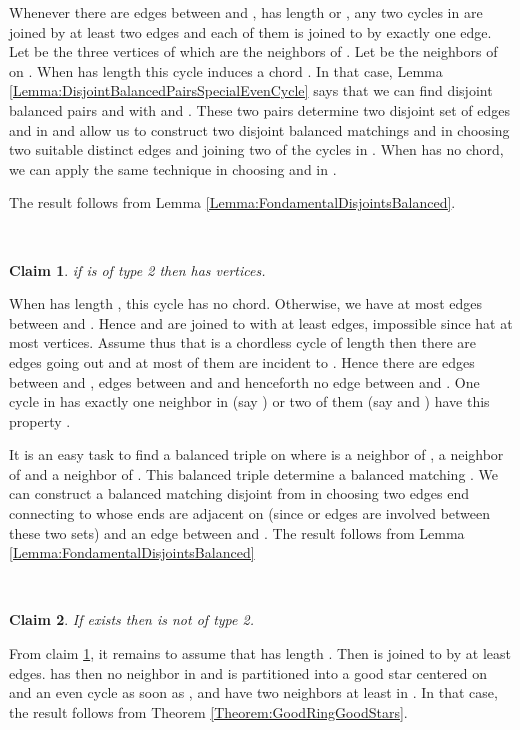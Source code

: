 \documentclass{elsart}
\theoremstyle{plain} \theoremheaderfont{\scshape}
\newtheorem{Clm}{Claim}[Thm]
\newenvironment{Prf}{{\bf \noindent Proof } }{\hfill\\}
\newenvironment{PrfClaim}{{\bf Proof }}{{\hfill\tiny{\\}}}
\begin{document}
\begin{Prf}
\begin{PrfClaim}
Whenever there are  edges between  and ,  has length
 or , any two cycles in  are joined by at
least two edges and  each of them is joined to  by exactly one
edge. Let  be the three vertices of  which are the neighbors
of . Let  be the neighbors of  on
. When  has length  this cycle induces a  chord .
In that case, Lemma
\ref{Lemma:DisjointBalancedPairsSpecialEvenCycle} says that we can
find  disjoint balanced pairs  and  with
  and  . These two pairs determine two
disjoint set of edges  and  in  and allow
us to construct two disjoint balanced matchings 
and  in choosing two suitable distinct edges  and
 joining two of the cycles in . When  has
no chord, we can apply the same technique in choosing  and  in
.

The result follows from Lemma
\ref{Lemma:FondamentalDisjointsBalanced}.

\end{PrfClaim}

\begin{Clm} \label{Claim:Claim4_1_MinimumCounterExample32}
if   is  of type 2 then  has  vertices.
\end{Clm}
\begin{PrfClaim} When  has length , this cycle has no chord. Otherwise, we
have at most  edges between  and . Hence  and
 are joined to  with at least  edges, impossible since
 hat at most  vertices. Assume thus that  is a chordless
cycle of length  then there are  edges going out  and at most  of them are incident to . Hence
there are  edges between  and , 
edges between  and  and henceforth no
edge between  and . One cycle in  has
exactly one neighbor in  (say ) or two of them (say 
and ) have this property .


It is an easy task to find a balanced triple  on  where
 is a neighbor of ,  a neighbor of  and  a
neighbor of . This balanced triple determine a balanced
matching . We can construct a balanced matching 
disjoint from  in choosing two edges  end  connecting  to  whose ends are adjacent on  (since  or
 edges are involved between these two sets) and an edge  between  and . The result follows from Lemma
\ref{Lemma:FondamentalDisjointsBalanced}

\end{PrfClaim}

\begin{Clm} \label{Claim:Claim4_2_MinimumCounterExample32}
If  exists then  is  not of type 2.
\end{Clm}
\begin{PrfClaim} From claim \ref{Claim:Claim4_1_MinimumCounterExample32}, it remains to assume that
  has length . Then  is joined to
 by at least  edges.  has then no neighbor in  and
 is partitioned into a good star centered on  and an even
cycle as soon as ,  and  have two neighbors at least
in . In that case, the result follows from Theorem
\ref{Theorem:GoodRingGoodStars}.


\end{PrfClaim}
\end{Prf}
\end{document}
